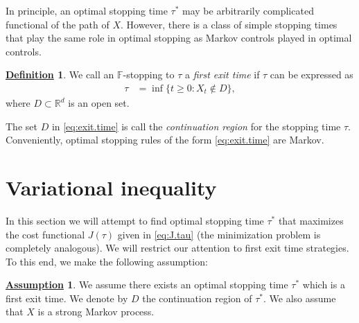 \documentclass[12pt]{book}
\numberwithin{equation}{chapter}
\theoremstyle{plain}
\numberwithin{theorem}{section}
\theoremstyle{definition}
\newtheorem{definition}[theorem]{\underline{Definition}}
\newtheorem{assumption}[theorem]{\underline{Assumption}}
\numberwithin{exercise}{chapter}
\newcommand{\<}{\langle}
\renewcommand{\>}{\rangle}
\renewcommand{\(}{\left(}
\renewcommand{\)}{\right)}
\renewcommand{\[}{\left[}
\renewcommand{\]}{\right]}
\newcommand\Fb{\mathds{F}}
\newcommand\Rb{\mathds{R}}
\begin{document}
\noindent
In principle, an optimal stopping time $\tau^*$ may be arbitrarily complicated functional of the path of $X$.  However, there is a class of simple stopping times that play the same role in optimal stopping as Markov controls played in optimal controls.  

\begin{definition}
\label{def:exit.time}
We call an $\Fb$-stopping to $\tau$ a \emph{first exit time} if $\tau$ can be expressed as
\begin{align}
\tau
	&=	\inf\{ t \geq 0 : X_t \notin D \} , \label{eq:exit.time}
\end{align}
where $D \subset \Rb^d$ is an open set.
\end{definition}

\noindent
The set $D$ in \eqref{eq:exit.time} is call the \emph{continuation region} for the stopping time $\tau$.  Conveniently, optimal stopping rules of the form \eqref{eq:exit.time} are Markov. 

\section{Variational inequality}
In this section we will attempt to find optimal stopping time $\tau^*$ that maximizes the cost functional $J(\tau)$ given in \eqref{eq:J.tau} (the minimization problem is completely analogous).  We will restrict our attention to first exit time strategies.  To this end, we make the following assumption:

\begin{assumption}
\label{ass:tau}
We assume there exists an optimal stopping time $\tau^*$ which is a first exit time.  We denote by $D$ the continuation region of $\tau^*$.  We also assume that $X$ is a strong Markov process.
\end{assumption}
\end{document}
